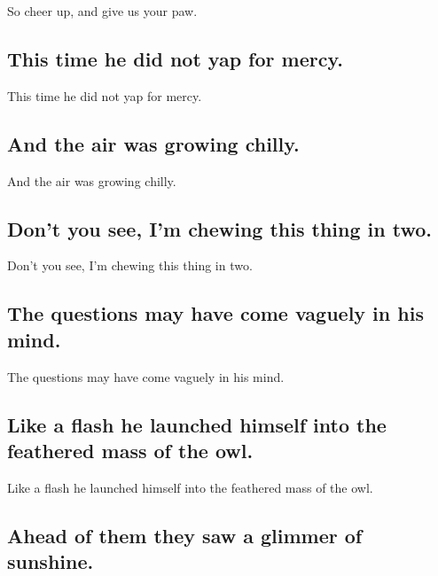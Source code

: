 \documentclass[]{article}
\begin{document}
So cheer up, and give us your paw.

\hypertarget{this-time-he-did-not-yap-for-mercy.}{%
\subsection{This time he did not yap for
mercy.}\label{this-time-he-did-not-yap-for-mercy.}}

This time he did not yap for mercy.

\hypertarget{and-the-air-was-growing-chilly.}{%
\subsection{And the air was growing
chilly.}\label{and-the-air-was-growing-chilly.}}

And the air was growing chilly.

\hypertarget{dont-you-see-im-chewing-this-thing-in-two.}{%
\subsection{Don't you see, I'm chewing this thing in
two.}\label{dont-you-see-im-chewing-this-thing-in-two.}}

Don't you see, I'm chewing this thing in two.

\hypertarget{the-questions-may-have-come-vaguely-in-his-mind.}{%
\subsection{The questions may have come vaguely in his
mind.}\label{the-questions-may-have-come-vaguely-in-his-mind.}}

The questions may have come vaguely in his mind.

\hypertarget{like-a-flash-he-launched-himself-into-the-feathered-mass-of-the-owl.}{%
\subsection{Like a flash he launched himself into the feathered mass of
the
owl.}\label{like-a-flash-he-launched-himself-into-the-feathered-mass-of-the-owl.}}

Like a flash he launched himself into the feathered mass of the owl.

\hypertarget{ahead-of-them-they-saw-a-glimmer-of-sunshine.}{%
\subsection{Ahead of them they saw a glimmer of
sunshine.}\label{ahead-of-them-they-saw-a-glimmer-of-sunshine.}}
\end{document}
